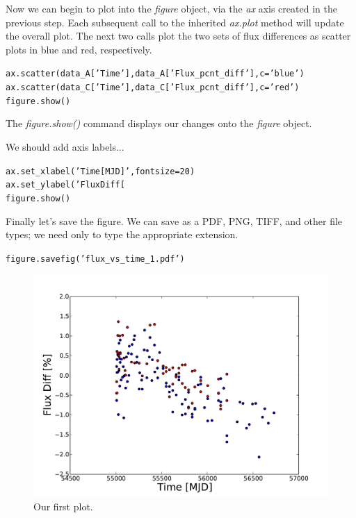 Now we can begin to plot into the \textit{figure} object, via the \textit{ax} 
axis created in the previous step. Each subsequent call to the inherited 
\textit{ax.plot} method will update the overall plot. The next two calls
plot the two sets of flux differences as scatter plots in blue and red,
respectively.

\begin{alltt}
\pytab ax.scatter(data_A['Time'], data_A['Flux_pcnt_diff'], c='blue')
\pytab ax.scatter(data_C['Time'], data_C['Flux_pcnt_diff'], c='red')
\pytab figure.show()
\end{alltt}

The \textit{figure.show()} command displays our changes onto the \textit{figure}
object.

We should add axis labels...

\begin{alltt}
\pytab ax.set_xlabel('Time [MJD]', fontsize=20)
\pytab ax.set_ylabel('Flux Diff [%
\pytab figure.show()
\end{alltt}

Finally let's save the figure. We can save as a PDF, PNG, TIFF, and
other file types; we need only to type the appropriate extension.

\begin{alltt}
\pytab figure.savefig('flux_vs_time_1.pdf')
\end{alltt}


\begin{figure}[tbp]
  \centering
    \includegraphics[scale=0.55]{flux_vs_time_1.pdf}
    \caption{Our first plot.}
  \label{fig:splot}
\end{figure}

